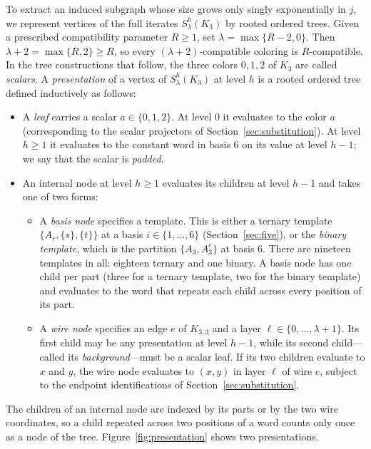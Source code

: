 To extract an induced subgraph whose size grows only singly exponentially in $j$, we represent vertices of the full iterates $S^h_\lambda(K_3)$ by rooted ordered trees. Given a prescribed compatibility parameter $R\ge1$, set $\lambda=\max\{R-2,0\}$. Then $\lambda+2=\max\{R,2\}\ge R$, so every $(\lambda+2)$-compatible coloring is $R$-compatible. In the tree constructions that follow, the three colors $0,1,2$ of $K_3$ are called \emph{scalars}. A \emph{presentation} of a vertex of $S^h_\lambda(K_3)$ at level $h$ is a rooted ordered tree defined inductively as follows:
\begin{itemize}
\item A \emph{leaf} carries a scalar $a\in\{0,1,2\}$. At level $0$ it evaluates to the color $a$ (corresponding to the scalar projectors of Section~\ref{sec:substitution}). At level $h\ge1$ it evaluates to the constant word in basis $6$ on its value at level $h-1$; we say that the scalar is \emph{padded}.
\item An internal node at level $h\ge1$ evaluates its children at level $h-1$ and takes one of two forms:
  \begin{itemize}
  \item A \emph{basis node} specifies a template. This is either a ternary template $\{A_r,\{s\},\{t\}\}$ at a basis $i\in\{1,\ldots,6\}$ (Section~\ref{sec:five}), or the \emph{binary template}, which is the partition $\{A_3,A_3^c\}$ at basis $6$. There are nineteen templates in all: eighteen ternary and one binary. A basis node has one child per part (three for a ternary template, two for the binary template) and evaluates to the word that repeats each child across every position of its part.
  \item A \emph{wire node} specifies an edge $e$ of $K_{3,3}$ and a layer $\ell\in\{0,\ldots,\lambda+1\}$. Its first child may be any presentation at level $h-1$, while its second child---called its \emph{background}---must be a scalar leaf. If its two children evaluate to $x$ and $y$, the wire node evaluates to $(x,y)$ in layer $\ell$ of wire $e$, subject to the endpoint identifications of Section~\ref{sec:substitution}.
  \end{itemize}
\end{itemize}
The children of an internal node are indexed by its parts or by the two wire coordinates, so a child repeated across two positions of a word counts only once as a node of the tree. Figure~\ref{fig:presentation} shows two presentations.

